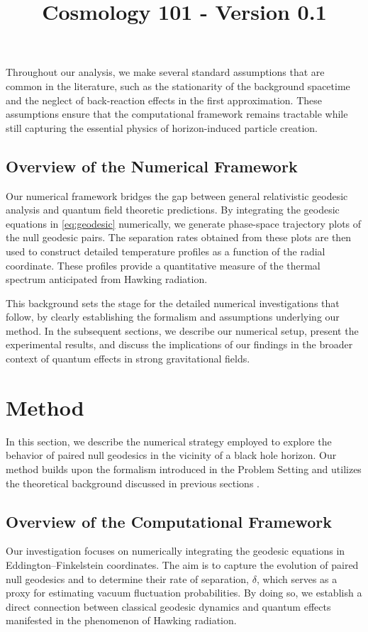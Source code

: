 \documentclass{article}\usepackage{graphicx} \usepackage{amsmath} \usepackage{colortbl}\title{Cosmology 101 - Version 0.1}
\begin{document}
Throughout our analysis, we make several standard assumptions that are common in the literature, such as the stationarity of the background spacetime and the neglect of back-reaction effects in the first approximation. These assumptions ensure that the computational framework remains tractable while still capturing the essential physics of horizon-induced particle creation.

\subsection{Overview of the Numerical Framework}
Our numerical framework bridges the gap between general relativistic geodesic analysis and quantum field theoretic predictions. By integrating the geodesic equations in \eqref{eq:geodesic} numerically, we generate phase-space trajectory plots of the null geodesic pairs. The separation rates obtained from these plots are then used to construct detailed temperature profiles as a function of the radial coordinate. These profiles provide a quantitative measure of the thermal spectrum anticipated from Hawking radiation.

This background sets the stage for the detailed numerical investigations that follow, by clearly establishing the formalism and assumptions underlying our method. In the subsequent sections, we describe our numerical setup, present the experimental results, and discuss the implications of our findings in the broader context of quantum effects in strong gravitational fields.

\section{Method}
In this section, we describe the numerical strategy employed to explore the behavior of paired null geodesics in the vicinity of a black hole horizon. Our method builds upon the formalism introduced in the Problem Setting and utilizes the theoretical background discussed in previous sections \cite{Hawking1975,Jacobson1993,Unruh1976}. 

\subsection{Overview of the Computational Framework}
Our investigation focuses on numerically integrating the geodesic equations in Eddington–Finkelstein coordinates. The aim is to capture the evolution of paired null geodesics and to determine their rate of separation, $\delta$, which serves as a proxy for estimating vacuum fluctuation probabilities. By doing so, we establish a direct connection between classical geodesic dynamics and quantum effects manifested in the phenomenon of Hawking radiation.
\end{document}
